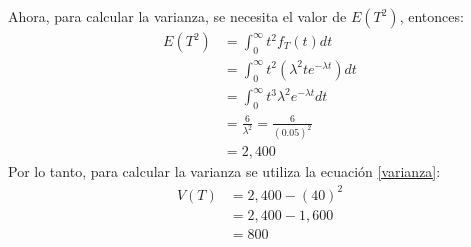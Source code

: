 \documentclass{article}
\begin{document}
Ahora, para calcular la varianza, se necesita el valor de $E(T^2)$, entonces:
\begin{align}
\nonumber
E{(T^2)}    & = \int_{0}^{\infty}t^2f_{T}(t)dt \\ \nonumber
            & = \int_{0}^{\infty}t^2(\lambda^2 te^{- \lambda t})dt \\ \nonumber
            & = \int_{0}^{\infty} t^3 \lambda^2 e^{- \lambda t}dt \\ \nonumber
            & = \frac{6}{\lambda^2} = \frac{6}{(0.05)^2} \\ \nonumber
            & = 2,400
\end{align}
Por lo tanto, para calcular la varianza se utiliza la ecuación \ref{varianza}:
\begin{align}
V{(T)}  & = 2,400 - (40)^2 \\ \nonumber
        & = 2,400 - 1,600 \\ \nonumber
        & = 800 \\ \nonumber
\end{align}




\end{document}
